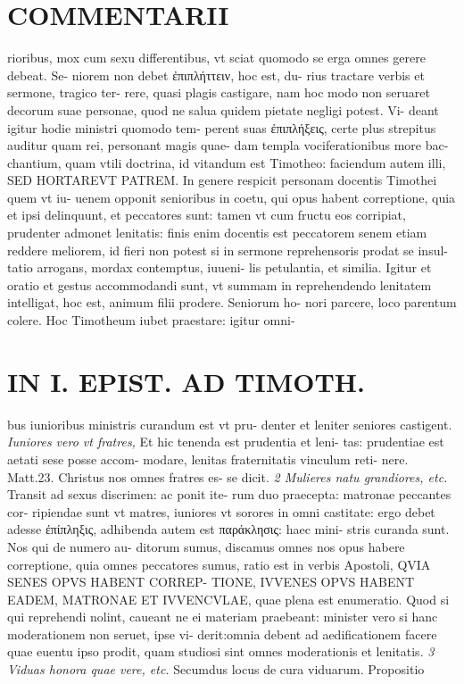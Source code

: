 \documentclass{article}
\begin{document}
\begin{pages}
\section*{COMMENTARII }
\marginpar{[ p.118 ]}\pstart rioribus, mox cum sexu differentibus, vt sciat quomodo se erga omnes gerere debeat. Se- niorem non debet ἐπιπλήττειν, hoc est, du- rius tractare verbis et sermone, tragico ter- rere, quasi plagis castigare, nam hoc modo non seruaret decorum suae personae, quod ne salua quidem pietate negligi potest. Vi- deant igitur hodie ministri quomodo tem- perent suas ἐπιπλήξεις, certe plus strepitus auditur quam rei, personant magis quae- dam templa vociferationibus more bac- chantium, quam vtili doctrina, id vitandum est Timotheo: faciendum autem illi, SED HORTAREVT PATREM. In genere respicit personam docentis Timothei quem vt iu- uenem opponit senioribus in coetu, qui opus habent correptione, quia et ipsi delinquunt, et peccatores sunt: tamen vt cum fructu eos corripiat, prudenter admonet lenitatis: finis enim docentis est peccatorem senem etiam reddere meliorem, id fieri non potest si in sermone reprehensoris prodat se insul- tatio arrogans, mordax contemptus, iuueni- lis petulantia, et similia. Igitur et oratio et gestus accommodandi sunt, vt summam in reprehendendo lenitatem intelligat, hoc est, animum filii prodere. Seniorum ho- nori parcere, loco parentum colere. Hoc Timotheum iubet praestare: igitur omni-  \pend
\section*{IN I. EPIST. AD TIMOTH. }
\marginpar{[ p.119 ]}\pstart bus iunioribus ministris curandum est vt pru- denter et leniter seniores castigent.  \pend
\textit{Iuniores vero vt fratres, }\pstart Et hic tenenda est prudentia et leni- tas: prudentiae est aetati sese posse accom- modare, lenitas fraternitatis vinculum reti- nere. Matt.23. Christus nos omnes fratres es- se dicit.  \pend
\textit{2 Mulieres natu grandiores, etc. }\pstart Transit ad sexus discrimen: ac ponit ite- rum duo praecepta: matronae peccantes cor- ripiendae sunt vt matres, iuniores vt sorores in omni castitate: ergo debet adesse ἐπίπληξις, adhibenda autem est παράκλησις: haec mini- stris curanda sunt. Nos qui de numero au- ditorum sumus, discamus omnes nos opus habere correptione, quia omnes peccatores sumus, ratio est in verbis Apostoli, QVIA SENES OPVS HABENT CORREP- TIONE, IVVENES OPVS HABENT EADEM, MATRONAE ET IVVENCVLAE, quae plena est enumeratio. Quod si qui reprehendi nolint, caueant ne ei materiam praebeant: minister vero si hanc moderationem non seruet, ipse vi- derit:omnia debent ad aedificationem facere quae euentu ipso prodit, quam studiosi sint omnes moderationis et lenitatis.  \pend
\textit{3 Viduas honora quae vere, etc. }\pstart Secumdus locus de cura viduarum. Propositio  \pend

\end{pages}
\end{document}
